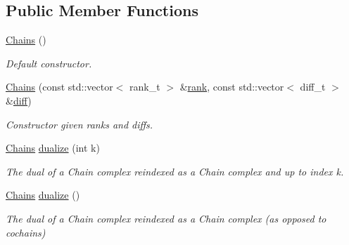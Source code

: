 \subsection*{Public Member Functions}
\begin{DoxyCompactItemize}
\item 
\hyperlink{classMackey_1_1Chains_ade226a800be59b53f1f1850e0753dbcb}{Chains} ()
\begin{DoxyCompactList}\small\item\em Default constructor. \end{DoxyCompactList}\item 
\hyperlink{classMackey_1_1Chains_a23e36ad0f810adeecad83b87b7034335}{Chains} (const std\+::vector$<$ rank\+\_\+t $>$ \&\hyperlink{classMackey_1_1Chains_ad041dff6f210ae5be4de0a3b076a4d95}{rank}, const std\+::vector$<$ diff\+\_\+t $>$ \&\hyperlink{classMackey_1_1Chains_a9ccee2cbb3daa1e82bab920aeef59516}{diff})
\begin{DoxyCompactList}\small\item\em Constructor given ranks and diffs. \end{DoxyCompactList}\item 
\hyperlink{classMackey_1_1Chains}{Chains} \hyperlink{classMackey_1_1Chains_a9aa778859604adb53977935b03caa5a5}{dualize} (int k)
\begin{DoxyCompactList}\small\item\em The dual of a Chain complex reindexed as a Chain complex and up to index k. \end{DoxyCompactList}\item 
\hyperlink{classMackey_1_1Chains}{Chains} \hyperlink{classMackey_1_1Chains_a199843c84295e6755a41cf80ed0db7fd}{dualize} ()
\begin{DoxyCompactList}\small\item\em The dual of a Chain complex reindexed as a Chain complex (as opposed to cochains) \end{DoxyCompactList}\end{DoxyCompactItemize}
